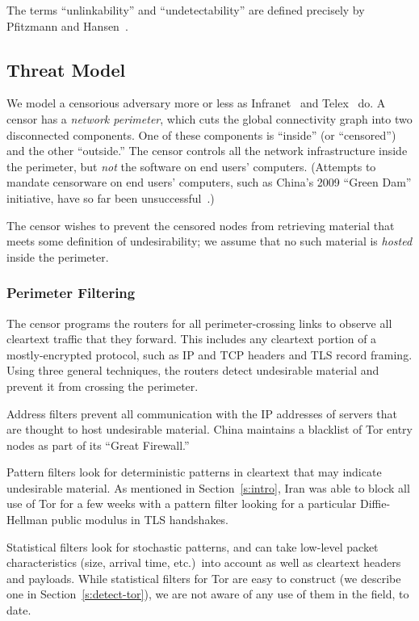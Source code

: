 \smallskip\noindent
The terms “unlinkability” and “undetectability” are defined precisely
by Pfitzmann and Hansen~\cite{s-anon-terms}.

\subsection{Threat Model}

We model a censorious adversary more or less as
Infranet~\cite{c-infranet} and Telex~\cite{c-telex} do.  A censor has
a \emph{network perimeter}, which cuts the global connectivity graph
into two disconnected components.  One of these components is “inside”
(or “censored”) and the other “outside.”  The censor controls all the
network infrastructure inside the perimeter, but \emph{not} the
software on end users' computers. (Attempts to mandate censorware on
end users' computers, such as China's 2009 “Green Dam” initiative,
have so far been unsuccessful~\cite{n-greendam}.)

The censor wishes to prevent the censored nodes from retrieving
material that meets some definition of undesirability; we assume that
no such material is \emph{hosted} inside the perimeter.

\subsubsection{Perimeter Filtering}

The censor programs the routers for all perimeter-crossing links to
observe all cleartext traffic that they forward.  This includes any
cleartext portion of a mostly-encrypted protocol, such as IP and TCP
headers and TLS record framing.  Using three general techniques, the
routers detect undesirable material and prevent it from crossing the
perimeter.

\begin{asparadesc}
\item[Address filters] prevent all communication with the IP addresses
  of servers that are thought to host undesirable material.  China
  maintains a blacklist of Tor entry nodes as part of its “Great
  Firewall.”

\item[Pattern filters] look for deterministic patterns in cleartext
  that may indicate undesirable material.  As mentioned in
  Section~\ref{s:intro}, Iran was able to block all use of Tor for a
  few weeks with a pattern filter looking for a particular
  Diffie-Hellman public modulus in TLS handshakes.

\item[Statistical filters] look for stochastic patterns, and can take
  low-level packet characteristics (size, arrival time, etc.)\ into
  account as well as cleartext headers and payloads.  While
  statistical filters for Tor are easy to construct (we describe one
  in Section~\ref{s:detect-tor}), we are not aware of any use of them
  in the field, to date.

\end{asparadesc}

